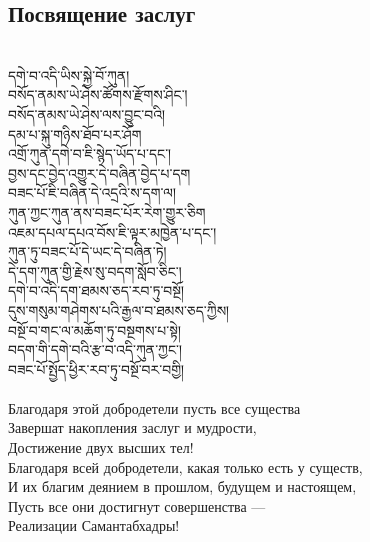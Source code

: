 \newpage
\subsection{Посвящение заслуг}
\\
\ti
དགེ་བ་འདི་ཡིས་སྐྱེ་བོ་ཀུན།\\
བསོད་ནམས་ཡེ་ཤེས་ཚོགས་རྫོགས་ཤིང༌།\\
བསོད་ནམས་ཡེ་ཤེས་ལས་བྱུང་བའི།\\
དམ་པ་སྐུ་གཉིས་ཐོབ་པར་ཤོག \\
འགྲོ་ཀུན་དགེ་བ་ཇི་སྙེད་ཡོད་པ་དང༌།\\
བྱས་དང་བྱེད་འགྱུར་དེ་བཞིན་བྱེད་པ་དག \\
བཟང་པོ་ཇི་བཞིན་དེ་འདྲའི་ས་དག་ལ།\\
ཀུན་ཀྱང་ཀུན་ནས་བཟང་པོར་རེག་གྱུར་ཅིག\\
འཇམ་དཔལ་དཔའ་བོས་ཇི་ལྟར་མཁྱེན་པ་དང༌། \\
ཀུན་ཏུ་བཟང་པོ་དེ་ཡང་དེ་བཞིན་ཏེ།\\
དེ་དག་ཀུན་གྱི་རྗེས་སུ་བདག་སློབ་ཅིང༌། \\
དགེ་བ་འདི་དག་ཐམས་ཅད་རབ་ཏུ་བསྔོ།\\
དུས་གསུམ་གཤེགས་པའི་རྒྱལ་བ་ཐམས་ཅད་ཀྱིས།\\
བསྔོ་བ་གང་ལ་མཆོག་ཏུ་བསྔགས་པ་སྟེ།\\
བདག་གི་དགེ་བའི་རྩ་བ་འདི་ཀུན་ཀྱང༌།\\
བཟང་པོ་སྤྱོད་ཕྱིར་རབ་ཏུ་བསྔོ་བར་བགྱི། \\
\\
\ru
Благодаря этой добродетели пусть все существа\\
Завершат накопления заслуг и мудрости,\\
Достижение двух высших тел!\\
Благодаря всей добродетели, какая только есть у существ,\\
И их благим деянием в прошлом, будущем и настоящем,\\
Пусть все они достигнут совершенства —\\
Реализации Самантабхадры!\\
\newpage
